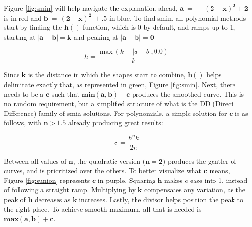 Figure \ref{fig:smin} will help navigate the explanation ahead, $\mathbf{a\ =\ -\left(2-x\right)^{2}+2}$ is in red and $\mathbf{b\ =\ \left(2-x\right)^{2}\ +.5}$ in blue. To find smin, all polynomial methods start by finding the $\mathbf{h()}$ function, which is 0 by default, and ramps up to 1, starting at $\mathbf{|a - b|=k}$ and peaking at $\mathbf{|a - b|=0}$:

\begin{equation}
    h = \frac{\max(k - |a - b|, 0.0)}{k}
    \label{eq:example_equation}
\end{equation}

Since $\mathbf{k}$ is the distance in which the shapes start to combine, $\mathbf{h()}$ helps delimitate exactly that, as represented in green, Figure \ref{fig:smin}. Next, there needs to be a $\mathbf{c}$ such that $\mathbf{min(a,b)-c}$ produces the smoothed curve. This is no random requirement, but a simplified structure of what is the DD (Direct Difference) family of smin solutions. For polynomials, a simple solution for $\mathbf{c}$ is as follows, with $\mathbf{n>1.5}$ already producing great results:

\begin{equation}
    c\ =\frac{h^{n}k}{2n}
    \label{eq:example_equation}
\end{equation}

Between all values of $\mathbf{n}$, the quadratic version ($\mathbf{n=2}$) produces the gentler of curves, and is prioritized over the others. To better visualize what $\mathbf{c}$ means, Figure \ref{fig:sunion} represents $\mathbf{c}$ in purple. Squaring $\mathbf{h}$ makes c ease into 1, instead of following a straight ramp. Multiplying by $\mathbf{k}$ compensates any variation, as the peak of $\mathbf{h}$ decreases as $\mathbf{k}$ increases. Lastly, the divisor helps position the peak to the right place.
To achieve smooth maximum, all that is needed is $\mathbf{max(a,b)+c}$.

